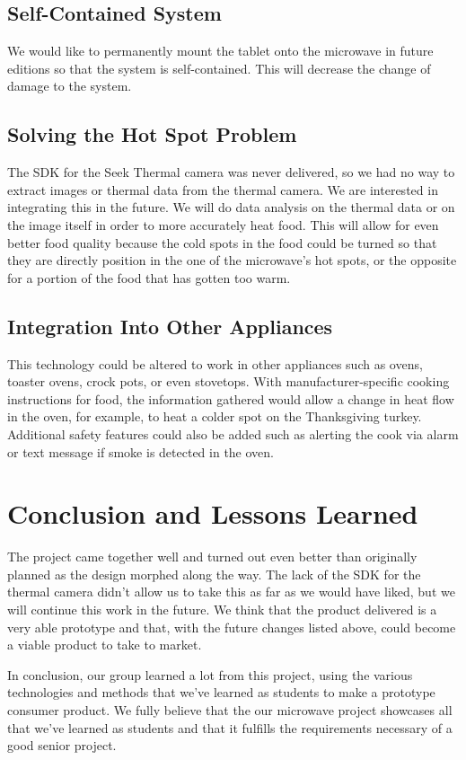 \documentclass[10pt,journal,letterpaper,twocolumn]{IEEEtran}
\begin{document}
\subsection*{Self-Contained System}
We would like to permanently mount the tablet onto the microwave in future editions so that the system is self-contained. This will decrease the change of damage to the system.
\subsection*{Solving the Hot Spot Problem}
The SDK for the Seek Thermal camera was never delivered, so we had no way to extract images or thermal data from the thermal camera. We are interested in integrating this in the future. We will do data analysis on the thermal data or on the image itself in order to more accurately heat food. This will allow for even better food quality because the cold spots in the food could be turned so that they are directly position in the one of the microwave's hot spots, or the opposite for a portion of the food that has gotten too warm.

\subsection*{Integration Into Other Appliances}
This technology could be altered to work in other appliances such as ovens, toaster ovens, crock pots, or even stovetops. With manufacturer-specific cooking instructions for food, the information gathered would allow a change in heat flow in the oven, for example, to heat a colder spot on the Thanksgiving turkey. Additional safety features could also be added such as alerting the cook via alarm or text message if smoke is detected in the oven.

\section{Conclusion and Lessons Learned}
The project came together well and turned out even better than originally planned as the design morphed along the way. The lack of the SDK for the thermal camera didn't allow us to take this as far as we would have liked, but we will continue this work in the future. We think that the product delivered is a very able prototype and that, with the future changes listed above, could become a viable product to take to market. 

In conclusion, our group learned a lot from this project, using the various technologies and methods that we've learned as students to make a prototype consumer product.  We fully believe that the our microwave project showcases all that we've learned as students and that it fulfills the requirements necessary of a good senior project.
\end{document}
